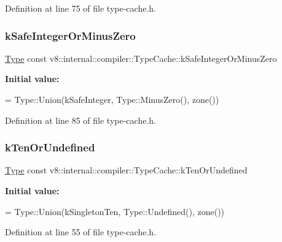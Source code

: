 Definition at line 75 of file type-\/cache.\+h.

\mbox{\label{classv8_1_1internal_1_1compiler_1_1TypeCache_a05274ef62a60642aebe8237e73acf040}} 
\subsubsection{\texorpdfstring{k\+Safe\+Integer\+Or\+Minus\+Zero}{kSafeIntegerOrMinusZero}}
{\footnotesize\ttfamily \mbox{\hyperlink{classv8_1_1internal_1_1compiler_1_1Type}{Type}} const v8\+::internal\+::compiler\+::\+Type\+Cache\+::k\+Safe\+Integer\+Or\+Minus\+Zero}

{\bfseries Initial value\+:}
\begin{DoxyCode}
=
      Type::Union(kSafeInteger, Type::MinusZero(), zone())
\end{DoxyCode}


Definition at line 85 of file type-\/cache.\+h.

\mbox{\label{classv8_1_1internal_1_1compiler_1_1TypeCache_a22829bd4436cff93d1f38bfe86ea60e3}} 
\subsubsection{\texorpdfstring{k\+Ten\+Or\+Undefined}{kTenOrUndefined}}
{\footnotesize\ttfamily \mbox{\hyperlink{classv8_1_1internal_1_1compiler_1_1Type}{Type}} const v8\+::internal\+::compiler\+::\+Type\+Cache\+::k\+Ten\+Or\+Undefined}

{\bfseries Initial value\+:}
\begin{DoxyCode}
=
      Type::Union(kSingletonTen, Type::Undefined(), zone())
\end{DoxyCode}


Definition at line 55 of file type-\/cache.\+h.

